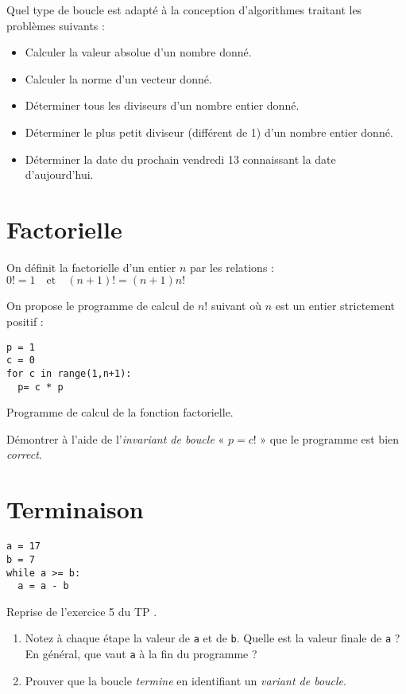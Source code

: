 Quel type de boucle est adapté à la conception d'algorithmes traitant les problèmes suivants :
\begin{itemize}
 \item Calculer la valeur absolue d'un nombre donné.
 \item Calculer la norme d'un vecteur donné.
 \item Déterminer tous les diviseurs d'un nombre entier donné.
 \item Déterminer le plus petit diviseur (différent de 1) d'un nombre entier donné.
 \item Déterminer la date du prochain vendredi 13 connaissant la date d'aujourd'hui.
\end{itemize}

\section{Factorielle}

On définit la factorielle d'un entier $n$ par les relations : $0!=1 \quad \text{et}\quad (n+1)!=(n+1)n!$

On propose le programme de calcul de $n!$ suivant où $n$ est un entier strictement positif :

\begin{listing}[!h]
\begin{verbatim}
p = 1
c = 0
for c in range(1,n+1):
  p= c * p
\end{verbatim}
\caption{Programme de calcul de la fonction factorielle.}
\label{prog:factorielle}
\end{listing}

Démontrer à l'aide de l'\textit{invariant de boucle} « $p =c!$ » que le programme est bien \textit{correct}.

\section{Terminaison}

\begin{listing}[!h]
\begin{verbatim}
a = 17
b = 7
while a >= b:
  a = a - b
\end{verbatim}
\caption{Reprise de l'exercice 5 du TP .}
\label{prog:programmeresteeuclidien}
\end{listing}

\begin{enumerate}

\item Notez à chaque étape la valeur de \texttt{a} et de \texttt{b}. Quelle est la valeur finale de \texttt{a} ? En général, que vaut \verb?a? à la fin du programme ?

\item Prouver que la boucle \textit{termine} en identifiant un \textit{variant de boucle}.

\end{enumerate}

